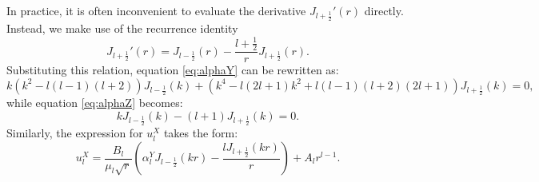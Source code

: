 \documentclass[11pt,a4paper]{article}
\numberwithin{equation}{section}
\begin{document}
\begin{remark}
  In practice, it is often inconvenient to evaluate the derivative $J_{l +
  \frac{1}{2}}' (r)$ directly. Instead, we make use of the recurrence identity
  \[ J_{l + \frac{1}{2}}' (r) = J_{l - \frac{1}{2}} (r) - \frac{l +
     \frac{1}{2}}{r} J_{l + \frac{1}{2}} (r) . \]
  Substituting this relation, equation \eqref{eq:alphaY} can be rewritten as:
  \[ k (k^2 - l (l - 1) (l + 2)) J_{l - \frac{1}{2}} (k) + (k^4 - l (2 l + 1)
     k^2 + l (l - 1) (l + 2) (2 l + 1)) J_{l + \frac{1}{2}} (k) = 0, \]
  while equation \eqref{eq:alphaZ} becomes:
  \[ kJ_{l - \frac{1}{2}} (k) - (l + 1) J_{l + \frac{1}{2}} (k) = 0. \]
  Similarly, the expression for $u_l^X$ takes the form:
  \[ u_l^X = \frac{B_l}{\mu_l  \sqrt{r}}  \left( \alpha^Y_l J_{l -
     \frac{1}{2}} (kr) - \frac{lJ_{l + \frac{1}{2}} (kr)}{r} \right) + A_l
     r^{l - 1} . \]
\end{remark}
\end{document}
